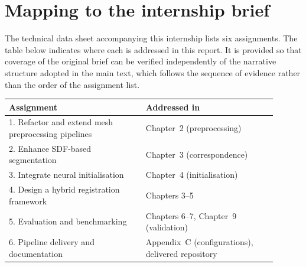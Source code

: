 \chapter{Mapping to the internship brief}
\label{app:mapping}

The technical data sheet accompanying this internship lists six assignments.
The table below indicates where each is addressed in this report. It is
provided so that coverage of the original brief can be verified independently
of the narrative structure adopted in the main text, which follows the
sequence of evidence rather than the order of the assignment list.

\begin{center}
\begin{tabular}{@{}p{0.46\linewidth}p{0.44\linewidth}@{}}
\toprule
\textbf{Assignment} & \textbf{Addressed in} \\
\midrule
1. Refactor and extend mesh preprocessing pipelines & Chapter~2 (preprocessing) \\
2. Enhance SDF-based segmentation & Chapter~3 (correspondence) \\
3. Integrate neural initialisation & Chapter~4 (initialisation) \\
4. Design a hybrid registration framework & Chapters 3--5 \\
5. Evaluation and benchmarking & Chapters 6--7, Chapter~9 (validation) \\
6. Pipeline delivery and documentation & Appendix~C (configurations), delivered repository \\
\bottomrule
\end{tabular}
\end{center}
